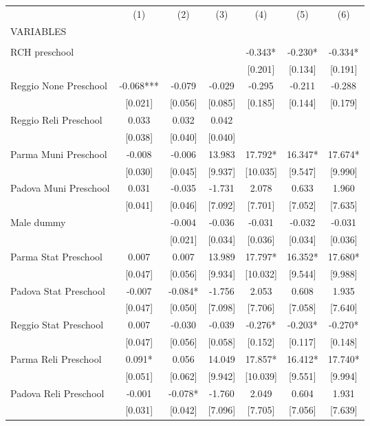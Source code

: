 \begin{tabular}{lcccccc} \hline
 & (1) & (2) & (3) & (4) & (5) & (6) \\
VARIABLES &  &  &  &  &  &  \\ \hline
 &  &  &  &  &  &  \\
RCH preschool &  &  &  & -0.343* & -0.230* & -0.334* \\
 &  &  &  & [0.201] & [0.134] & [0.191] \\
Reggio None Preschool & -0.068*** & -0.079 & -0.029 & -0.295 & -0.211 & -0.288 \\
 & [0.021] & [0.056] & [0.085] & [0.185] & [0.144] & [0.179] \\
Reggio Reli Preschool & 0.033 & 0.032 & 0.042 &  &  &  \\
 & [0.038] & [0.040] & [0.040] &  &  &  \\
Parma Muni Preschool & -0.008 & -0.006 & 13.983 & 17.792* & 16.347* & 17.674* \\
 & [0.030] & [0.045] & [9.937] & [10.035] & [9.547] & [9.990] \\
Padova Muni Preschool & 0.031 & -0.035 & -1.731 & 2.078 & 0.633 & 1.960 \\
 & [0.041] & [0.046] & [7.092] & [7.701] & [7.052] & [7.635] \\
Male dummy &  & -0.004 & -0.036 & -0.031 & -0.032 & -0.031 \\
 &  & [0.021] & [0.034] & [0.036] & [0.034] & [0.036] \\
Parma Stat Preschool & 0.007 & 0.007 & 13.989 & 17.797* & 16.352* & 17.680* \\
 & [0.047] & [0.056] & [9.934] & [10.032] & [9.544] & [9.988] \\
Padova Stat Preschool & -0.007 & -0.084* & -1.756 & 2.053 & 0.608 & 1.935 \\
 & [0.047] & [0.050] & [7.098] & [7.706] & [7.058] & [7.640] \\
Reggio Stat Preschool & 0.007 & -0.030 & -0.039 & -0.276* & -0.203* & -0.270* \\
 & [0.047] & [0.056] & [0.058] & [0.152] & [0.117] & [0.148] \\
Parma Reli Preschool & 0.091* & 0.056 & 14.049 & 17.857* & 16.412* & 17.740* \\
 & [0.051] & [0.062] & [9.942] & [10.039] & [9.551] & [9.994] \\
Padova Reli Preschool & -0.001 & -0.078* & -1.760 & 2.049 & 0.604 & 1.931 \\
 & [0.031] & [0.042] & [7.096] & [7.705] & [7.056] & [7.639] \\

\end{tabular}
